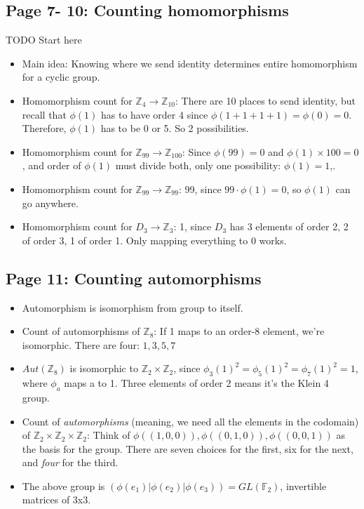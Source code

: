 \documentclass[11pt, oneside]{article}   	%
\begin{document}
\subsection{Page 7- 10: Counting homomorphisms}

TODO Start here
\begin{itemize}
\item Main idea: Knowing where we send identity determines entire homomorphism for a cyclic group.
\item Homomorphism count for $\mathbb{Z}_4 \rightarrow \mathbb{Z}_{10}$: There are 10 places to send identity, but recall that $\phi(1)$ has to have order 4 since $\phi(1 + 1 + 1 + 1) = \phi(0) = 0$.  Therefore, $\phi(1)$ has to be 0 or 5.  So 2 possibilities.
\item Homomorphism count for $\mathbb{Z}_{99} \rightarrow \mathbb{Z}_{100}$: Since $\phi(99) = 0$ and $\phi(1) \times 100 = 0$, and order of $\phi(1)$ must divide both, only one possibility: $\phi(1) = 1$,.
\item  Homomorphism count for $\mathbb{Z}_{99} \rightarrow \mathbb{Z}_{99}$: 99, since $99 \cdot \phi(1) = 0$, so $\phi(1)$ can go anywhere.
\item  Homomorphism count for $D_3 \rightarrow \mathbb{Z}_3$: 1, since $D_3$ has 3 elements of order 2, 2 of order 3, 1 of order 1.  Only mapping everything to $0$ works.
\end{itemize}


\subsection{Page 11: Counting automorphisms}
\begin{itemize}
\item Automorphism is isomorphism from group to itself.
\item Count of automorphisms of $\mathbb{Z}_8$: If 1 maps to an order-8 element, we're isomorphic.  There are four: ${1,3,5,7}$
\item $Aut(\mathbb{Z}_8)$ is isomorphic to $\mathbb{Z}_2 \times \mathbb{Z}_2$, since $\phi_3(1)^2 = \phi_5(1)^2 = \phi_7(1)^2 = 1$, where $\phi_a$ maps a to 1.  Three elements of order 2 means it's the Klein 4 group.
\item Count of \emph{automorphisms} (meaning, we need all the elements in the codomain) of $\mathbb{Z}_2 \times \mathbb{Z}_2 \times \mathbb{Z}_2$: Think of $\phi((1,0,0)), \phi((0,1,0)), \phi((0,0,1))$ as the basis for the group.  There are seven choices for the first, six for the next, and \emph{four} for the third.  
\item The above group is $(\phi(e_1) | \phi(e_2) | \phi(e_3)) = GL(\mathbb{F}_2)$, invertible matrices of 3x3.
\end{itemize}
\end{document}
